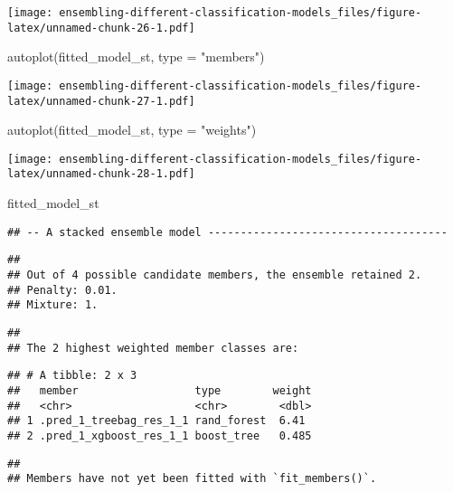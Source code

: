 \documentclass[
]{article}
\newenvironment{Shaded}{\begin{snugshade}}{\end{snugshade}}
\newcommand{\AttributeTok}[1]{\textcolor[rgb]{0.77,0.63,0.00}{#1}}
\newcommand{\FunctionTok}[1]{\textcolor[rgb]{0.00,0.00,0.00}{#1}}
\newcommand{\NormalTok}[1]{#1}
\newcommand{\StringTok}[1]{\textcolor[rgb]{0.31,0.60,0.02}{#1}}
\begin{document}
\texttt{[image: ensembling-different-classification-models\_files/figure-latex/unnamed-chunk-26-1.pdf]}

\begin{Shaded}
\begin{Highlighting}[]
\FunctionTok{autoplot}\NormalTok{(fitted\_model\_st, }\AttributeTok{type =} \StringTok{"members"}\NormalTok{)}
\end{Highlighting}
\end{Shaded}

\texttt{[image: ensembling-different-classification-models\_files/figure-latex/unnamed-chunk-27-1.pdf]}

\begin{Shaded}
\begin{Highlighting}[]
\FunctionTok{autoplot}\NormalTok{(fitted\_model\_st, }\AttributeTok{type =} \StringTok{"weights"}\NormalTok{)}
\end{Highlighting}
\end{Shaded}

\texttt{[image: ensembling-different-classification-models\_files/figure-latex/unnamed-chunk-28-1.pdf]}

\begin{Shaded}
\begin{Highlighting}[]
\NormalTok{fitted\_model\_st}
\end{Highlighting}
\end{Shaded}

\begin{verbatim}
## -- A stacked ensemble model -------------------------------------
\end{verbatim}

\begin{verbatim}
## 
## Out of 4 possible candidate members, the ensemble retained 2.
## Penalty: 0.01.
## Mixture: 1.
\end{verbatim}

\begin{verbatim}
## 
## The 2 highest weighted member classes are:
\end{verbatim}

\begin{verbatim}
## # A tibble: 2 x 3
##   member                  type        weight
##   <chr>                   <chr>        <dbl>
## 1 .pred_1_treebag_res_1_1 rand_forest  6.41 
## 2 .pred_1_xgboost_res_1_1 boost_tree   0.485
\end{verbatim}

\begin{verbatim}
## 
## Members have not yet been fitted with `fit_members()`.
\end{verbatim}
\end{document}
